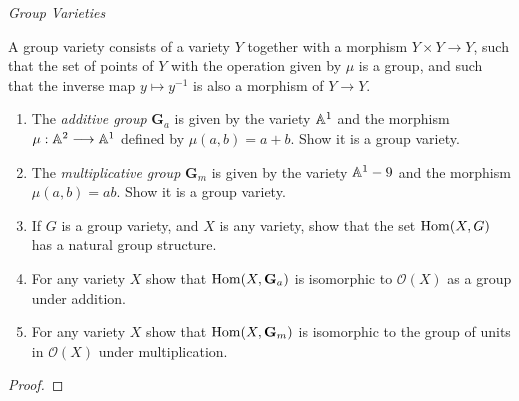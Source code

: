 \label{1.3.21}

\emph{Group Varieties}

A group variety consists of a variety $Y$ together with a morphism $Y \times Y \longrightarrow Y$, such that the set of points of $Y$ with the operation given by $\mu$ is a group, and such that the inverse map $y \mapsto y^{-1}$ is also a morphism of $Y \longrightarrow Y$.

\begin{enumerate}[label = (\alph*)]
    \item The \emph{additive group} $\mathbf G_{a}$ is given by the variety $\mathbb A^1$ and the morphism $\mu: \mathbb A^2 \longrightarrow \mathbb A^1$ defined by $\mu(a, b) = a + b$. Show it is a group variety.

    \item The \emph{multiplicative group} $\mathbf G_m$ is given by the variety $\mathbb A^1 - 9$ and the morphism $\mu(a, b) = ab$. Show it is a group variety.

    \item If $G$ is a group variety, and $X$ is any variety, show that the set $\operatorname{Hom}(X, G)$ has a natural group structure.

    \item For any variety $X$ show that $\operatorname{Hom}(X, \mathbf G_a)$ is isomorphic to $\mathcal O(X)$ as a group under addition.

    \item For any variety $X$ show that $\operatorname{Hom}(X, \mathbf G_m)$ is isomorphic to the group of units in $\mathcal O(X)$ under multiplication.
\end{enumerate}

\begin{proof}

\end{proof}
